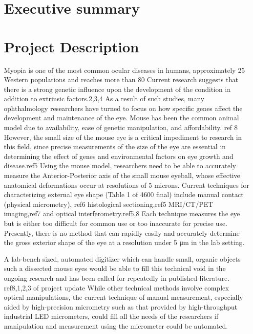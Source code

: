 \documentclass{article}
\begin{document}

\setcounter{tocdepth}{3}
\tableofcontents
\newpage

\section*{Executive summary}
\label{sec:exec-summary}

\newpage

\section{Project Description}
\label{sec:project-description}

Myopia is one of the most common ocular diseases in humans, approximately 25%
Western populations and reaches more than 80%
Current research suggests that there is a strong genetic influence upon the development of the
condition in addition to extrinsic factors.\cite{zhou99:genes,zhou99:models,schmucker04}2,3,4
As a result of such studies, many ophthalmology researchers have turned to
focus on how specific genes affect the development and maintenance of the eye. Mouse
has been the common animal model due to availability, ease of genetic manipulation, and affordability. \cite{schaeffel04}ref 8 
However, the small size of the mouse eye is a critical impediment to research in 
this field, since precise measurements of the size of the eye are essential in determining
the effect of genes and environmental factors on eye growth and disease.\cite{schaeffel04}ref5 
Using the mouse model, researchers need to be able to accurately measure
the Anterior-Posterior axis of the small mouse eyeball, whose effective anatomical deformations 
occur at resolutions of 5 microns. 
Current techniques for characterizing external eye shape (Table 1 of 4600 final) include manual contact
(physical micrometry),\cite{wallman04} ref6 histological sectioning,\cite{schaeffel04}ref5 MRI/CT/PET imaging,\cite{atchison04}ref7 and optical
interferometry.\cite{schaeffel04,guggenheim04}ref5,8 Each technique measures the eye but is either too difficult for common
use or too inaccurate for precise use. Presently, there is no method that can rapidly 
easily and accurately determine the gross exterior shape of the eye at a resolution under 5 μm 
in the lab setting.

A lab-bench sized, automated digitizer which can handle small, organic objects such a dissected mouse
eyes would be able to fill this technical void in the ongoing research and has been called for repeatedly in
published literature. \cite{schaeffel04,atchison04,zhou99:genes,zhou99:models} ref8,1,2,3 of project update
While other technical methods involve complex optical manipulations, the current
technique of manual measurement, especially aided by high-precision micrometry such as that provided by
high-throughput industrial LED micrometers, could fill all the needs of the researchers if manipulation and
measurement using the micrometer could be automated.
\end{document}
